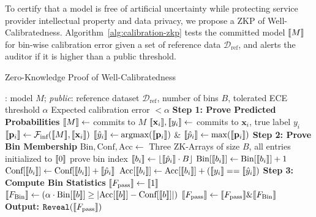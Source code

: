 To certify that a model is free of artificial uncertainty while protecting service provider intellectual property and data privacy, we propose a ZKP of Well-Calibratedness. Algorithm~\ref{alg:calibration-zkp} tests the committed model $\llbracket M \rrbracket$ for bin-wise calibration error given a set of reference data $\mathcal{D}_{\text{ref}}$, and alerts the auditor if it is higher than a public threshold.

\begin{algorithm}[h]
\small
\caption{Zero-Knowledge Proof of Well-Calibratedness}
\label{alg:calibration-zkp}
\begin{algorithmic}[1]
\Require
\prover: model $M$; \emph{public}: reference dataset $\mathcal{D}_{\text{ref}}$, number of bins $B$, tolerated ECE threshold $\alpha$
\Ensure Expected calibration error $< \alpha$
\State \textbf{Step 1: Prove Predicted Probabilities}
\State $\llbracket M \rrbracket \gets$ \prover commits to $M$
    \State $\llbracket \mathbf{x}_i \rrbracket, \llbracket y_i \rrbracket \gets$ \prover commits to $\mathbf{x}_i$, true label $y_i$
    \State $\llbracket \mathbf{p}_i \rrbracket \gets \mathcal{F}_{\text{inf}}(\llbracket M \rrbracket,\llbracket \mathbf{x}_i \rrbracket)$ {\scriptsize{}}
    \State $\llbracket \hat{y}_i \rrbracket \gets \text{argmax}(\llbracket \mathbf{p}_i \rrbracket)$ \& $\llbracket \hat{p}_i \rrbracket \gets \max (\llbracket \mathbf{p}_i \rrbracket)$
\EndFor
\State \textbf{Step 2: Prove Bin Membership}
\State $\text{Bin}, \text{Conf}, \text{Acc} \gets $ Three ZK-Arrays of size $B$, all entries initialized to $\llbracket 0 \rrbracket$
    \State prove bin index $\llbracket b_i \rrbracket \gets \lfloor \llbracket \hat{p}_i \rrbracket \cdot B \rfloor$ {\scriptsize{}}
    \State $\text{Bin}[\llbracket b_i \rrbracket] \gets \text{Bin}[\llbracket b_i \rrbracket] + 1$
    \State $\text{Conf}[\llbracket b_i \rrbracket] \gets \text{Conf}[\llbracket b_i \rrbracket] + \llbracket \hat{p}_i \rrbracket$
    \State $\text{Acc}[\llbracket b_i \rrbracket] \gets \text{Acc}[\llbracket b_i \rrbracket] + (\llbracket y_i \rrbracket == \llbracket \hat{y}_i \rrbracket)$
\EndFor
\State \textbf{Step 3: Compute Bin Statistics}
\State $\llbracket F_\text{pass} \rrbracket \gets \llbracket 1 \rrbracket$ {\scriptsize{}}
    \State $\llbracket F_\text{Bin} \rrbracket \gets (\alpha \cdot \text{Bin}[\llbracket b \rrbracket] \geq \left| \text{Acc}[\llbracket b \rrbracket] - \text{Conf}[\llbracket b \rrbracket] \right|)$
    {\scriptsize{}}
    \State $\llbracket F_\text{pass} \rrbracket \gets \llbracket F_\text{pass} \rrbracket \& \llbracket F_\text{Bin} \rrbracket$ 
\EndFor
\State \textbf{Output:} $\texttt{Reveal}(\llbracket F_\text{pass} \rrbracket)$
\end{algorithmic}
\end{algorithm}

